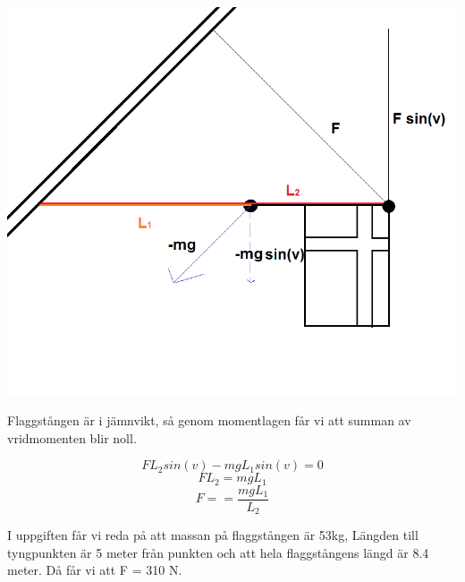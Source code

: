 \documentclass[a4paper,12pt]{article}
\begin{document}
\begin{enumerate}
    \includegraphics[scale=0.55]{Figur2.png}
    
    Flaggstången är i jämnvikt, så genom momentlagen får vi att summan av vridmomenten
    blir noll.

    $$FL_2sin(v)-mgL_1sin(v)=0$$
    $$FL_2=mgL_1$$
    $$F==\frac{mgL_1}{L_2}$$

    I uppgiften får vi reda på att massan på flaggstången är 53kg, Längden till 
    tyngpunkten är 5 meter från punkten och att hela flaggstångens längd
    är 8.4 meter. Då får vi att F = 310 N.

\end{enumerate}
\end{document}

